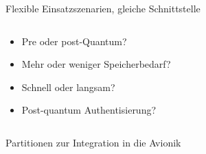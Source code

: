 \begin{frame}[c]{Flexible Einsatzszenarien, gleiche Schnittstelle}
  \begin{columns}[fullwidth,c]
  \hfill
    \begin{column}{.35\linewidth}
      \begin{itemize}
        \item Pre oder post-Quantum?
        \item Mehr oder weniger Speicherbedarf?
        \item Schnell oder langsam?
        \item Post-quantum Authentisierung? 
      \end{itemize}
    \end{column}%
  \end{columns}
\end{frame}


\begin{frame}[c]{Partitionen zur Integration in die Avionik}
\end{frame}








